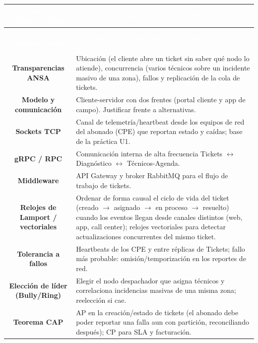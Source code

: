 \documentclass[11pt]{article}
\begin{document}
\begin{longtable}{C A}
\textcolor{white}{\textbf{Concepto (Unidad $\cdot$ Tema)}} & \textcolor{white}{\textbf{Alternativa de aplicación en este PFC}}\\
\endfirsthead
{}\textcolor{white}{\textbf{Concepto (Unidad $\cdot$ Tema)}} & \textcolor{white}{\textbf{Alternativa de aplicación en este PFC}}\\
\endhead
{}\\
\textbf{Transparencias ANSA} & Ubicación (el cliente abre un ticket sin saber qué nodo lo atiende), concurrencia (varios técnicos sobre un incidente masivo de una zona), fallos y replicación de la cola de tickets.\\
\textbf{Modelo y comunicación} & Cliente-servidor con dos frentes (portal cliente y app de campo). Justificar frente a alternativas.\\
\textbf{Sockets TCP} & Canal de telemetría/heartbeat desde los equipos de red del abonado (CPE) que reportan estado y caídas; base de la práctica U1.\\
\textbf{gRPC / RPC} & Comunicación interna de alta frecuencia Tickets $\leftrightarrow$ Diagnóstico $\leftrightarrow$ Técnicos-Agenda.\\
\textbf{Middleware} & API Gateway y broker RabbitMQ para el flujo de trabajo de tickets.\\
\textbf{Relojes de Lamport / vectoriales} & Ordenar de forma causal el ciclo de vida del ticket (creado $\rightarrow$ asignado $\rightarrow$ en proceso $\rightarrow$ resuelto) cuando los eventos llegan desde canales distintos (web, app, call center); relojes vectoriales para detectar actualizaciones concurrentes del mismo ticket.\\
\textbf{Tolerancia a fallos} & Heartbeats de los CPE y entre réplicas de Tickets; fallo más probable: omisión/temporización en los reportes de red.\\
\textbf{Elección de líder (Bully/Ring)} & Elegir el nodo despachador que asigna técnicos y correlaciona incidencias masivas de una misma zona; reelección si cae.\\
\textbf{Teorema CAP} & AP en la creación/estado de tickets (el abonado debe poder reportar una falla aun con partición, reconciliando después); CP para SLA y facturación.\\

\end{longtable}
\end{document}
